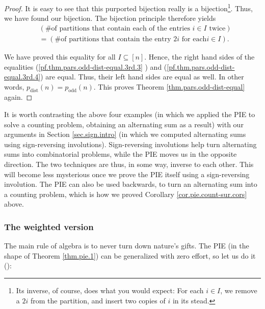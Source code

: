 \begin{proof}
It is easy to see that this purported bijection really is a
bijection\footnote{Its inverse, of course, does what you would expect: For
each $i\in I$, we remove a $2i$ from the partition, and insert two copies of
$i$ in its stead.}. Thus, we have found our bijection. The bijection principle
therefore yields%
\begin{align*}
&  \left(  \text{\# of partitions that contain each of the entries }i\in
I\text{ twice}\right) \\
&  =\left(  \text{\# of partitions that contain the entry }2i\text{ for each
}i\in I\right)  .
\end{align*}


We have proved this equality for all $I\subseteq\left[  n\right]  $. Hence,
the right hand sides of the equalities (\ref{pf.thm.pars.odd-dist-equal.3rd.3}%
) and (\ref{pf.thm.pars.odd-dist-equal.3rd.4}) are equal. Thus, their left
hand sides are equal as well. In other words, $p_{\operatorname*{dist}}\left(
n\right)  =p_{\operatorname*{odd}}\left(  n\right)  $. This proves Theorem
\ref{thm.pars.odd-dist-equal} again.
\end{proof}

\begin{remark}
It is worth contrasting the above four examples (in which we applied the PIE
to solve a counting problem, obtaining an alternating sum as a result) with
our arguments in Section \ref{sec.sign.intro} (in which we computed
alternating sums using sign-reversing involutions). Sign-reversing involutions
help turn alternating sums into combinatorial problems, while the PIE moves us
in the opposite direction. The two techniques are thus, in some way, inverse
to each other. This will become less mysterious once we prove the PIE itself
using a sign-reversing involution. The PIE can also be used backwards, to turn
an alternating sum into a counting problem, which is how we proved Corollary
\ref{cor.pie.count-sur.cors} above.
\end{remark}

\subsubsection{\label{subsec.sign.pie.wt}The weighted version}

The main rule of algebra is to never turn down nature's gifts. The PIE (in the
shape of Theorem \ref{thm.pie.1}) can be generalized with zero effort, so let
us do it (\cite[Theorem 7.8.9]{20f}):

